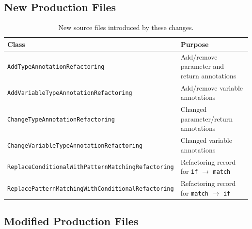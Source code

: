 \documentclass[11pt,a4paper]{article}
\newcommand{\code}[1]{\texttt{#1}}
\begin{document}
\subsection{New Production Files}

\begin{table}[ht]
  \centering
  \caption{New source files introduced by these changes.}
  \small
  \begin{tabular}{@{}ll@{}}
    \toprule
    \textbf{Class} & \textbf{Purpose} \\
    \midrule
    \code{AddTypeAnnotationRefactoring}               & Add/remove parameter and return annotations \\
    \code{AddVariableTypeAnnotationRefactoring}        & Add/remove variable annotations \\
    \code{ChangeTypeAnnotationRefactoring}             & Changed parameter/return annotations \\
    \code{ChangeVariableTypeAnnotationRefactoring}     & Changed variable annotations \\
    \code{ReplaceConditionalWithPatternMatchingRefactoring} & Refactoring record for \code{if} $\to$ \code{match} \\
    \code{ReplacePatternMatchingWithConditionalRefactoring} & Refactoring record for \code{match} $\to$ \code{if} \\
    \bottomrule
  \end{tabular}
\end{table}

\subsection{Modified Production Files}
\end{document}
